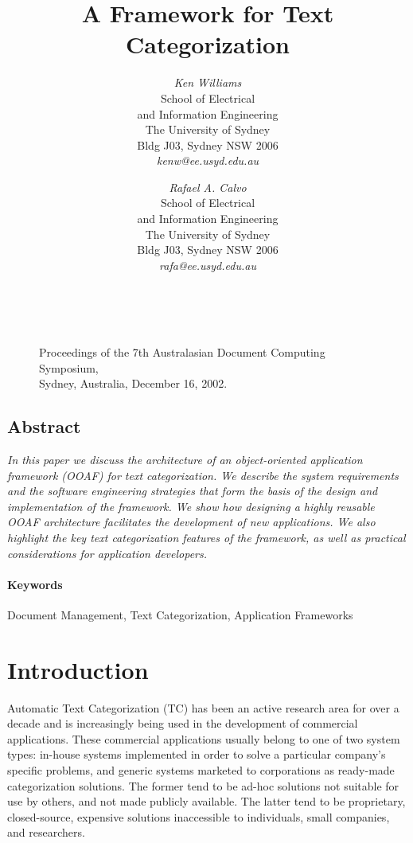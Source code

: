 \documentclass[twocolumn]{article}
\title{A Framework for Text Categorization}
\author{
{\em Ken Williams}\\[1ex]
School of Electrical\\
and Information Engineering\\
The University of Sydney\\
Bldg J03, Sydney NSW 2006\\[1ex]
{\em kenw@ee.usyd.edu.au}
\and
{\em Rafael A. Calvo}\\[1ex]
School of Electrical\\
and Information Engineering\\
The University of Sydney\\
Bldg J03, Sydney NSW 2006\\[1ex]
{\em rafa@ee.usyd.edu.au}
}
\date{}
\begin{document}
\maketitle
\thispagestyle{empty}


        \begin{figure}[b]
	~\\
        \noindent
        {\small\bf\raggedright
        Proceedings of the 7th Australasian 
	Document Computing Symposium,\\
	Sydney, Australia,
        December 16, 2002.
        }
        \end{figure}


\subsection*{\centering Abstract}
\noindent
{\it 
In this paper we discuss the architecture of an object-oriented
application framework (OOAF) for text categorization. We describe the
system requirements and the software engineering strategies that
form the basis of the design and implementation of the framework.  We show how
designing a highly reusable OOAF architecture facilitates the
development of new applications.  We also highlight the key text
categorization features of the framework, as well as practical
considerations for application developers.
}

\paragraph{Keywords} 
Document Management, Text Categorization, Application Frameworks


\section{Introduction}

Automatic Text Categorization (TC) has been an active research area
for over a decade and is increasingly being used in the development of
commercial applications.  These commercial applications usually belong to
one of two system types: in-house systems implemented in order to
solve a particular company's specific problems, and generic systems marketed to
corporations as ready-made categorization solutions.  The former tend
to be ad-hoc solutions not suitable for use by others, and not made
publicly available.  The
latter tend to be proprietary, closed-source, expensive solutions
inaccessible to individuals, small companies, and researchers.
\end{document}
